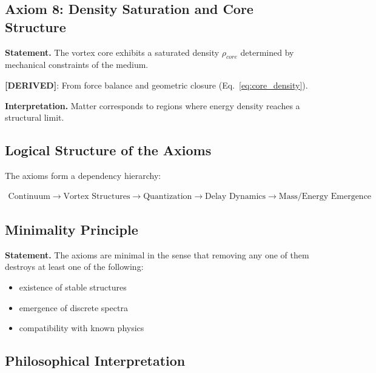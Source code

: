     \subsection{Axiom 8: Density Saturation and Core Structure}
        
        \textbf{Statement.}
        The vortex core exhibits a saturated density $\rho_{core}$ determined by mechanical constraints of the medium.
        
        \textbf{[DERIVED]}: From force balance and geometric closure (Eq.~\ref{eq:core_density}).
        
        \textbf{Interpretation.}
        Matter corresponds to regions where energy density reaches a structural limit.
    
    \subsection{Logical Structure of the Axioms}
        
        The axioms form a dependency hierarchy:
        
        \begin{align}
            \text{Continuum}
            \rightarrow \text{Vortex Structures}
            \rightarrow \text{Quantization}
            \rightarrow \text{Delay Dynamics}
            \rightarrow \text{Mass/Energy Emergence}
        \end{align}
    
    \subsection{Minimality Principle}
        
        \textbf{Statement.}
        The axioms are minimal in the sense that removing any one of them destroys at least one of the following:
        
        \begin{itemize}
            \item existence of stable structures
            \item emergence of discrete spectra
            \item compatibility with known physics
        \end{itemize}
    
    \subsection{Philosophical Interpretation}
        
